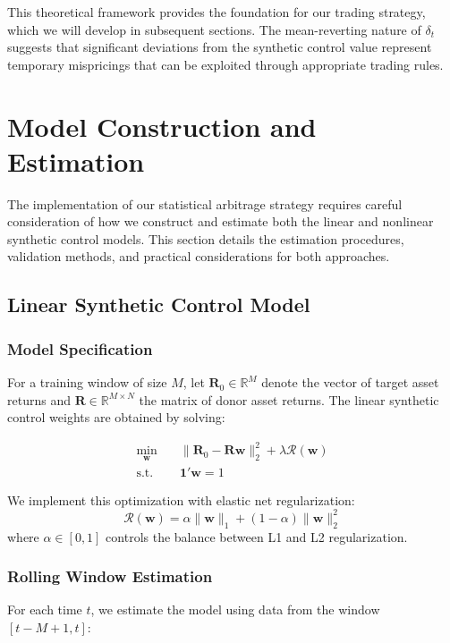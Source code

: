This theoretical framework provides the foundation for our trading strategy, which we will develop in subsequent sections. The mean-reverting nature of $\delta_t$ suggests that significant deviations from the synthetic control value represent temporary mispricings that can be exploited through appropriate trading rules.


\section{Model Construction and Estimation}

The implementation of our statistical arbitrage strategy requires careful consideration of how we construct and estimate both the linear and nonlinear synthetic control models. This section details the estimation procedures, validation methods, and practical considerations for both approaches.

\subsection{Linear Synthetic Control Model}

\subsubsection{Model Specification}
For a training window of size $M$, let $\mathbf{R}_0 \in \mathbb{R}^M$ denote the vector of target asset returns and $\mathbf{R} \in \mathbb{R}^{M \times N}$ the matrix of donor asset returns. The linear synthetic control weights are obtained by solving:

\begin{equation}
\begin{aligned}
    \min_{\mathbf{w}} & \quad \|\mathbf{R}_0 - \mathbf{R}\mathbf{w}\|_2^2 + \lambda\mathcal{R}(\mathbf{w}) \\
    \text{s.t.} & \quad \mathbf{1}'\mathbf{w} = 1
\end{aligned}
\end{equation}

We implement this optimization with elastic net regularization:
\begin{equation}
    \mathcal{R}(\mathbf{w}) = \alpha\|\mathbf{w}\|_1 + (1-\alpha)\|\mathbf{w}\|_2^2
\end{equation}
where $\alpha \in [0,1]$ controls the balance between L1 and L2 regularization.

\subsubsection{Rolling Window Estimation}
For each time $t$, we estimate the model using data from the window $[t-M+1, t]$:

